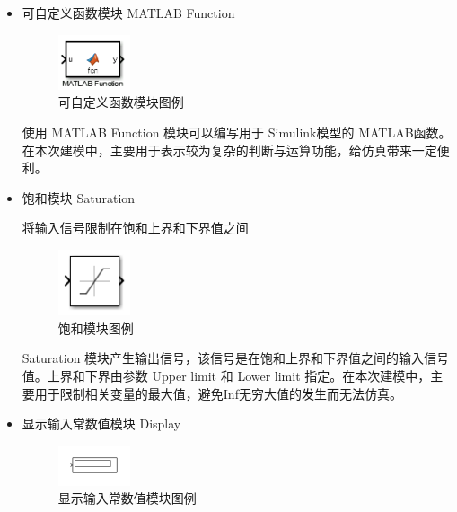 \begin{itemize}
	\item 可自定义函数模块 MATLAB Function
	
	\begin{figure}[H]
		\centering
		\includegraphics[width=0.2\textwidth]{fig/simulink/matlab_function_block.png}
		\caption{可自定义函数模块图例}\label{fig:matlab_function_block}
	\end{figure}
	
	使用 MATLAB Function 模块可以编写用于 Simulink模型的 MATLAB函数。在本次建模中，主要用于表示较为复杂的判断与运算功能，给仿真带来一定便利。
	
	\item 饱和模块 Saturation
	
	将输入信号限制在饱和上界和下界值之间
	
	\begin{figure}[H]
		\centering
		\includegraphics[width=0.2\textwidth]{fig/simulink/saturation_block.png}
		\caption{饱和模块图例}\label{fig:saturation_block}
	\end{figure}
	
	Saturation 模块产生输出信号，该信号是在饱和上界和下界值之间的输入信号值。上界和下界由参数 Upper limit 和 Lower limit 指定。在本次建模中，主要用于限制相关变量的最大值，避免Inf无穷大值的发生而无法仿真。
	
	\item 显示输入常数值模块 Display
	
	\begin{figure}[H]
		\centering
		\includegraphics[width=0.2\textwidth]{fig/simulink/display_block.png}
		\caption{显示输入常数值模块图例}\label{fig:display_block}
	\end{figure}
	

\end{itemize}
